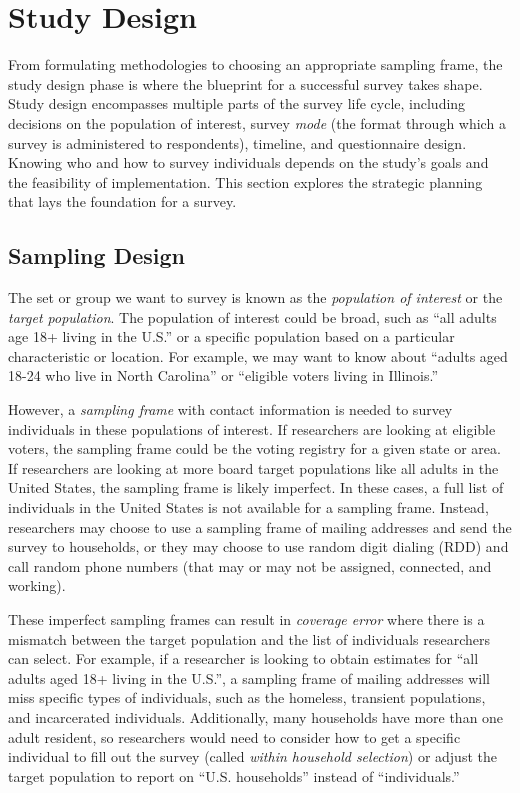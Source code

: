 \documentclass[
]{krantz}
\begin{document}
\hypertarget{overview-design}{%
\section{Study Design}\label{overview-design}}

From formulating methodologies to choosing an appropriate sampling frame, the study design phase is where the blueprint for a successful survey takes shape. Study design encompasses multiple parts of the survey life cycle, including decisions on the population of interest, survey \emph{mode} (the format through which a survey is administered to respondents), timeline, and questionnaire design. Knowing who and how to survey individuals depends on the study's goals and the feasibility of implementation. This section explores the strategic planning that lays the foundation for a survey.

\hypertarget{overview-design-sampdesign}{%
\subsection{Sampling Design}\label{overview-design-sampdesign}}

The set or group we want to survey is known as the \emph{population of interest} or the \emph{target population}. The population of interest could be broad, such as ``all adults age 18+ living in the U.S.'' or a specific population based on a particular characteristic or location. For example, we may want to know about ``adults aged 18-24 who live in North Carolina'' or ``eligible voters living in Illinois.''

However, a \emph{sampling frame} with contact information is needed to survey individuals in these populations of interest. If researchers are looking at eligible voters, the sampling frame could be the voting registry for a given state or area. If researchers are looking at more board target populations like all adults in the United States, the sampling frame is likely imperfect. In these cases, a full list of individuals in the United States is not available for a sampling frame. Instead, researchers may choose to use a sampling frame of mailing addresses and send the survey to households, or they may choose to use random digit dialing (RDD) and call random phone numbers (that may or may not be assigned, connected, and working).

These imperfect sampling frames can result in \emph{coverage error} where there is a mismatch between the target population and the list of individuals researchers can select. For example, if a researcher is looking to obtain estimates for ``all adults aged 18+ living in the U.S.'', a sampling frame of mailing addresses will miss specific types of individuals, such as the homeless, transient populations, and incarcerated individuals. Additionally, many households have more than one adult resident, so researchers would need to consider how to get a specific individual to fill out the survey (called \emph{within household selection}) or adjust the target population to report on ``U.S. households'' instead of ``individuals.''
\end{document}
